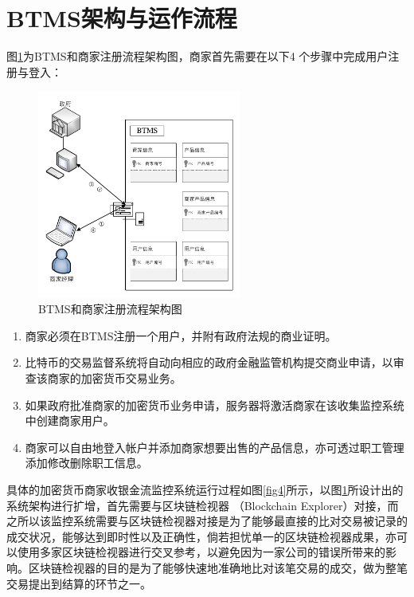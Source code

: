 \section{BTMS架构与运作流程}

	图\ref{fig3}为BTMS和商家注册流程架构图，商家首先需要在以下4 个步骤中完成⽤户注册与登⼊：

	\begin{figure}[!htbp]
		\centering
		\includegraphics[width = 0.6\textwidth]{fig3.pdf}
		\caption{BTMS和商家注册流程架构图}\label{fig3}
	\end{figure}

	\begin{enumerate}
		\item 商家必须在BTMS注册一个用户，并附有政府法规的商业证明。
		\item 比特币的交易监督系统将自动向相应的政府金融监管机构提交商业申请，以审查该商家的加密货币交易业务。
		\item 如果政府批准商家的加密货币业务申请，服务器将激活商家在该收集监控系统中创建商家用户。
		\item 商家可以自由地登入帐户并添加商家想要出售的产品信息，亦可透过职工管理添加修改删除职工信息。
	\end{enumerate}

	具体的加密货币商家收银金流监控系统运行过程如图\ref{fig4}所示，以图\ref{fig3}所设计出的系统架构进行扩增，首先需要与区块链检视器 （Blockchain Explorer）\supercite{Blockchainexplorer:Ananalyticalprocessandinvestigationenvironmentforbitcoin}对接，而之所以该监控系统需要与区块链检视器对接是为了能够最直接的比对交易被记录的成交状况，能够达到即时性以及正确性，倘若担忧单一的区块链检视器成果，亦可以使用多家区块链检视器进行交叉参考，以避免因为一家公司的错误所带来的影响。区块链检视器的目的是为了能够快速地准确地比对该笔交易的成交，做为整笔交易提出到结算的环节之一。

